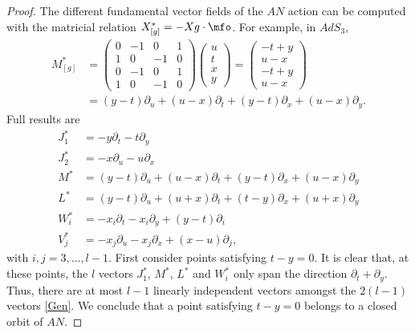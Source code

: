 \begin{proof}
	The different fundamental vector fields of the $AN$ action can be computed with the matricial relation $X^*_{[g]}=-Xg\cdot\mfo$. For example, in $AdS_3$,
	\[
		\begin{split}
			M^*_{[g]}&=
			\begin{pmatrix}
				0 & -1 & 0  & 1 \\
				1 & 0  & -1 & 0 \\
				0 & -1 & 0  & 1 \\
				1 & 0  & -1 & 0
			\end{pmatrix}
			\begin{pmatrix}
				u \\t\\x\\y
			\end{pmatrix}
			=
			\begin{pmatrix}
				-t+y \\u-x\\-t+y\\u-x
			\end{pmatrix}\\
			&=(y-t)\partial_u+(u-x)\partial_t+(y-t)\partial_x+(u-x)\partial_y.
		\end{split}
	\]
	Full results are
	\begin{subequations}\label{Gen}
		\begin{align}
			J_1^* & =-y\partial_t-t\partial_y							\label{EqNormeJun}                                                   \\
			J_2^* & =-x\partial_u-u\partial_x                                                      \label{eq:Jds} \\
			M^*   & =(y-t)\partial_u+(u-x)\partial_t+(y-t)\partial_x+(u-x)\partial_y                              \\
			L^*   & =(y-t)\partial_u+(u+x)\partial_t+(t-y)\partial_x+(u+x)\partial_y                              \\
			W_i^* & =-x_i\partial_t-x_i\partial_y+(y-t)\partial_i                                                 \\
			V_j^* & =-x_j\partial_u-x_j\partial_x+(x-u)\partial_j,
			\label{eq:Vjs}
		\end{align}
	\end{subequations}
	with $i,j=3,\ldots,l-1$.
	First consider points satisfying $t-y=0$. It is clear that, at these points, the $l$ vectors $J_1^*$, $M^*$, $L^*$ and $W_i^*$ only span the direction $\partial_t+\partial_y$. Thus, there are at most $l-1$ linearly independent vectors amongst the $2(l-1)$ vectors \eqref{Gen}. We conclude that a point satisfying $t-y=0$ belongs to a closed orbit of $AN$.


\end{proof}
